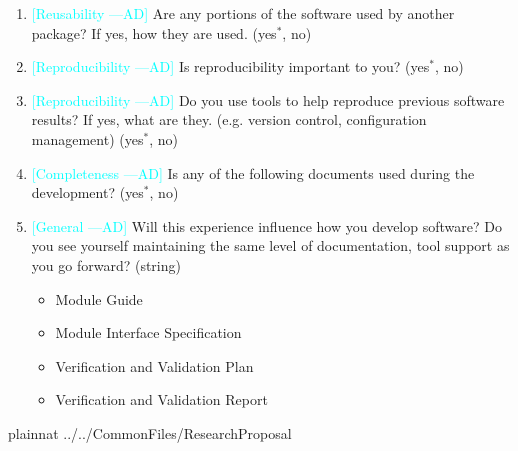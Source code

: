 \documentclass[letterpaper,cleveref]{lipics-v2019}
\newcommand{\authornote}[3]{\textcolor{#1}{[#3 ---#2]}}
\newcommand{\authornote}[3]{}
\newcommand{\ad}[1]{\authornote{cyan}{AD}{#1}} %
\theoremstyle{definition}
\begin{document}
\begin{enumerate}
\item \ad{Reusability} Are any portions of the software used by another package? If yes, how they are used. ({yes$^*$, no})
\item \ad{Reproducibility} Is reproducibility important to you? ({yes$^*$, no})
\item \ad{Reproducibility} Do you use tools to help reproduce previous software results? If yes, what are they. (e.g. version control, configuration management) ({yes$^*$, no})
\item \ad{Completeness} Is any of the following documents used during the development? ({yes$^*$, no})
\item \ad{General} Will this experience influence how you develop software? Do you see yourself maintaining the same level of documentation, tool support as you go forward? (string)
\begin{itemize}
\item Module Guide
\item Module Interface Specification
\item Verification and Validation Plan
\item Verification and Validation Report
\end{itemize}
\end{enumerate}

\newpage

 {plainnat}
 {../../CommonFiles/ResearchProposal}
\end{document}
